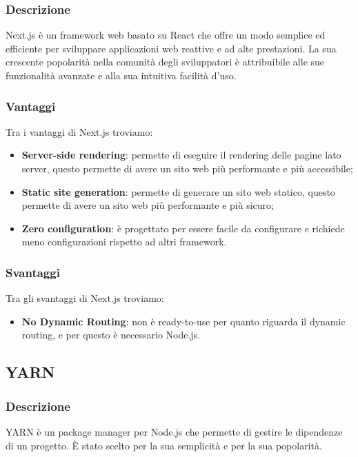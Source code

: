 \subsubsection*{Descrizione}
Next.js è un framework web basato su React che offre un modo semplice ed efficiente per sviluppare applicazioni web reattive e ad alte prestazioni. La sua crescente popolarità nella comunità degli sviluppatori è attribuibile alle sue funzionalità avanzate e alla sua intuitiva facilità d'uso.

\subsubsection*{Vantaggi}
Tra i vantaggi di Next.js troviamo:
\begin{itemize}
    \item \textbf{Server-side rendering}: permette di eseguire il rendering delle pagine lato server, questo permette di avere un sito web più performante e più accessibile;
    \item \textbf{Static site generation}: permette di generare un sito web statico, questo permette di avere un sito web più performante e più sicuro;
    \item \textbf{Zero configuration}: è progettato per essere facile da configurare e richiede meno configurazioni rispetto ad altri framework.
\end{itemize}

\subsubsection*{Svantaggi}
Tra gli svantaggi di Next.js troviamo:
\begin{itemize}
    \item \textbf{No Dynamic Routing}: non è ready-to-use per quanto riguarda il dynamic routing, e per questo è necessario Node.js.
\end{itemize}


\subsection*{YARN}

\subsubsection*{Descrizione}
YARN è un package manager per Node.js che permette di gestire le dipendenze di un progetto. È stato scelto per la sua semplicità e per la sua popolarità.

